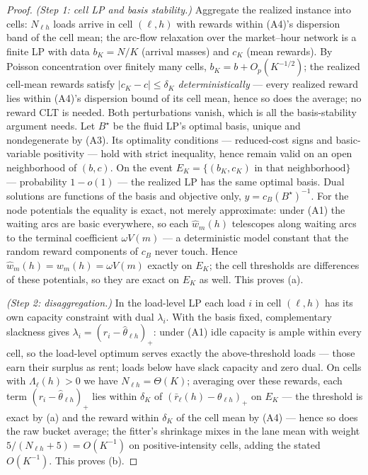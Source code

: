 \documentclass[11pt]{article}
\begin{document}
\begin{proof}
\emph{(Step 1: cell LP and basis stability.)} Aggregate the realized
instance into cells: $N_{\ell h}$ loads arrive in cell $(\ell, h)$ with
rewards within (A4)'s dispersion band of the cell mean; the
arc-flow relaxation over the market--hour network
is a finite LP with data $b_K = N/K$ (arrival masses) and $c_K$ (mean
rewards). By Poisson concentration over finitely many cells,
$b_K = b + O_p(K^{-1/2})$; the realized cell-mean rewards satisfy
$|c_K - c| \leq \delta_K$ \emph{deterministically} --- every
realized reward lies within (A4)'s dispersion bound of its cell mean,
hence so does the average; no reward CLT is needed. Both
perturbations vanish, which is all the basis-stability argument
needs. Let $B^{\star}$
be the fluid LP's optimal basis, unique and nondegenerate by (A3). Its
optimality conditions --- reduced-cost signs and basic-variable
positivity \citep[e.g.,][]{bertsimas1997introduction} --- hold with
strict inequality, hence remain valid on an open neighborhood of
$(b, c)$. On the event
$E_K = \{(b_K, c_K) \text{ in that neighborhood}\}$ --- probability
$1 - o(1)$ --- the realized LP has the same optimal basis. Dual
solutions are functions of the basis and objective only,
$y = c_B (B^{\star})^{-1}$. For the node potentials the equality is
exact, not merely approximate: under (A1) the waiting arcs are basic
everywhere, so each $\hat{w}_m(h)$ telescopes along waiting arcs to
the terminal coefficient $\omega V(m)$ --- a deterministic model
constant that the random reward components of $c_B$ never touch. Hence
$\hat{w}_m(h) = w_m(h) = \omega V(m)$ exactly on $E_K$; the cell
thresholds are differences of these potentials, so they are exact on
$E_K$ as well. This proves (a).

\emph{(Step 2: disaggregation.)} In the load-level LP each load $i$ in
cell $(\ell, h)$ has its own capacity constraint with dual $\lambda_i$.
With the basis fixed, complementary slackness gives
$\lambda_i = (r_i - \hat{\theta}_{\ell h})_+$: under (A1) idle capacity
is ample within every cell, so the load-level optimum serves exactly
the above-threshold loads --- those earn their surplus as rent; loads
below have slack capacity and zero dual. On cells with
$\Lambda_{\ell}(h) > 0$ we have $N_{\ell h} = \Theta(K)$; averaging
over these rewards,
each term $(r_i - \hat{\theta}_{\ell h})_+$ lies within $\delta_K$
of $(\bar{r}_{\ell}(h) - \theta_{\ell h})_+$ on $E_K$ --- the
threshold is exact by (a) and the reward within $\delta_K$ of the
cell mean by (A4) --- hence so does the raw bucket average; the
fitter's shrinkage mixes in the lane mean with weight
$5/(N_{\ell h} + 5) = O(K^{-1})$ on positive-intensity cells, adding
the stated $O(K^{-1})$. This proves (b).


\end{proof}
\end{document}
